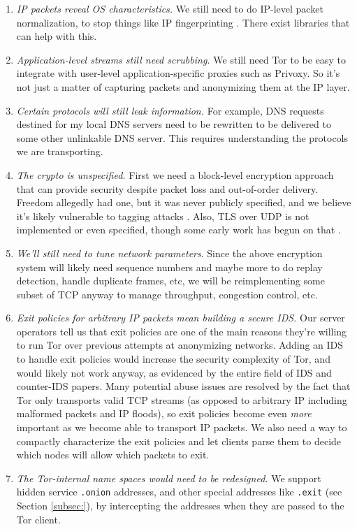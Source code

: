 \documentclass{llncs}
\begin{document}
\begin{enumerate}
\setlength{\itemsep}{0mm}
\setlength{\parsep}{0mm}
\item \emph{IP packets reveal OS characteristics.} We still need to do
IP-level packet normalization, to stop things like IP fingerprinting
\cite{ip-fingerprinting}. There exist libraries \cite{ip-normalizing}
that can help with this.
\item \emph{Application-level streams still need scrubbing.} We still need
Tor to be easy to integrate with user-level application-specific proxies
such as Privoxy. So it's not just a matter of capturing packets and
anonymizing them at the IP layer.
\item \emph{Certain protocols will still leak information.} For example,
DNS requests destined for my local DNS servers need to be rewritten
to be delivered to some other unlinkable DNS server. This requires
understanding the protocols we are transporting.
\item \emph{The crypto is unspecified.} First we need a block-level encryption
approach that can provide security despite
packet loss and out-of-order delivery. Freedom allegedly had one, but it was
never publicly specified, and we believe it's likely vulnerable to tagging
attacks \cite{tor-design}. Also, TLS over UDP is not implemented or even
specified, though some early work has begun on that \cite{dtls}.
\item \emph{We'll still need to tune network parameters}. Since the above
encryption system will likely need sequence numbers and maybe more to do
replay detection, handle duplicate frames, etc, we will be reimplementing
some subset of TCP anyway to manage throughput, congestion control, etc.
\item \emph{Exit policies for arbitrary IP packets mean building a secure
IDS.}  Our server operators tell us that exit policies are one of
the main reasons they're willing to run Tor over previous attempts
at anonymizing networks.  Adding an IDS to handle exit policies would
increase the security complexity of Tor, and would likely not work anyway,
as evidenced by the entire field of IDS and counter-IDS papers. Many
potential abuse issues are resolved by the fact that Tor only transports
valid TCP streams (as opposed to arbitrary IP including malformed packets
and IP floods), so exit policies become even \emph{more} important as
we become able to transport IP packets. We also need a way to compactly
characterize the exit policies and let clients parse them to decide
which nodes will allow which packets to exit.
\item \emph{The Tor-internal name spaces would need to be redesigned.} We
support hidden service {\tt{.onion}} addresses, and other special addresses
like {\tt{.exit}} (see Section \ref{subsec:}), by intercepting the addresses
when they are passed to the Tor client.
\end{enumerate}
\end{document}
